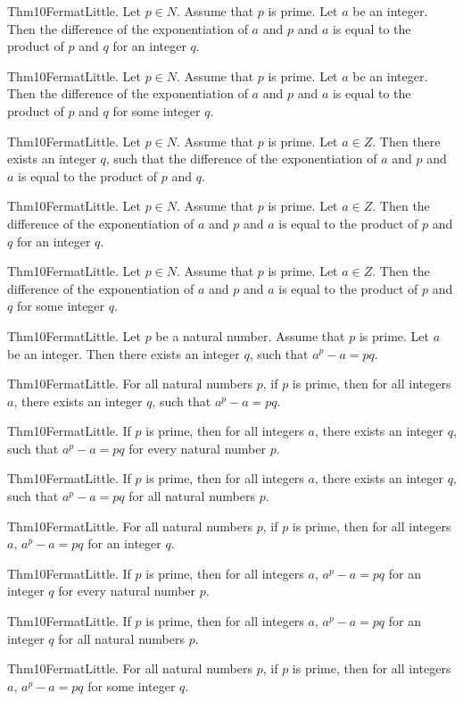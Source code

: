 \documentclass{article}
\begin{document}
Thm10FermatLittle. Let $p \in N$. Assume that $p$ is prime. Let $a$ be an integer. Then the difference of the exponentiation of $a$ and $p$ and $a$ is equal to the product of $p$ and $q$ for an integer $q$.

Thm10FermatLittle. Let $p \in N$. Assume that $p$ is prime. Let $a$ be an integer. Then the difference of the exponentiation of $a$ and $p$ and $a$ is equal to the product of $p$ and $q$ for some integer $q$.

Thm10FermatLittle. Let $p \in N$. Assume that $p$ is prime. Let $a \in Z$. Then there exists an integer $q$, such that the difference of the exponentiation of $a$ and $p$ and $a$ is equal to the product of $p$ and $q$.

Thm10FermatLittle. Let $p \in N$. Assume that $p$ is prime. Let $a \in Z$. Then the difference of the exponentiation of $a$ and $p$ and $a$ is equal to the product of $p$ and $q$ for an integer $q$.

Thm10FermatLittle. Let $p \in N$. Assume that $p$ is prime. Let $a \in Z$. Then the difference of the exponentiation of $a$ and $p$ and $a$ is equal to the product of $p$ and $q$ for some integer $q$.

Thm10FermatLittle. Let $p$ be a natural number. Assume that $p$ is prime. Let $a$ be an integer. Then there exists an integer $q$, such that $a ^ {p}- a = p q$.

Thm10FermatLittle. For all natural numbers $p$, if $p$ is prime, then for all integers $a$, there exists an integer $q$, such that $a ^ {p}- a = p q$.

Thm10FermatLittle. If $p$ is prime, then for all integers $a$, there exists an integer $q$, such that $a ^ {p}- a = p q$ for every natural number $p$.

Thm10FermatLittle. If $p$ is prime, then for all integers $a$, there exists an integer $q$, such that $a ^ {p}- a = p q$ for all natural numbers $p$.

Thm10FermatLittle. For all natural numbers $p$, if $p$ is prime, then for all integers $a$, $a ^ {p}- a = p q$ for an integer $q$.

Thm10FermatLittle. If $p$ is prime, then for all integers $a$, $a ^ {p}- a = p q$ for an integer $q$ for every natural number $p$.

Thm10FermatLittle. If $p$ is prime, then for all integers $a$, $a ^ {p}- a = p q$ for an integer $q$ for all natural numbers $p$.

Thm10FermatLittle. For all natural numbers $p$, if $p$ is prime, then for all integers $a$, $a ^ {p}- a = p q$ for some integer $q$.
\end{document}
